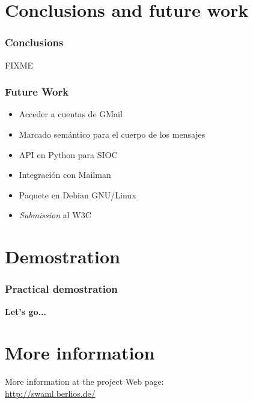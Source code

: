 \documentclass[spanish,notes=hide,16pt]{beamer}
\begin{document}
\section{Conclusions and future work}
\frame
{
  \frametitle{Conclusions}

  FIXME

}
\frame
{
  \frametitle{Future Work}

  \begin{itemize}
   \item \begin{Large}Acceder a cuentas de GMail\end{Large}
   \item \begin{Large}Marcado semántico para el cuerpo de los mensajes\end{Large}
   \item \begin{Large}API en Python para SIOC\end{Large}
   \item \begin{Large}Integración con Mailman\end{Large}
   \item \begin{Large}Paquete en Debian GNU/Linux\end{Large}
   \item \begin{Large}\textit{Submission} al W3C\end{Large}
  \end{itemize}
}

\section{Demostration}
\frame
{
  \frametitle{Practical demostration}

  \begin{center}
    \LARGE{\textbf{Let's go...}}
  \end{center}
}

\appendix

\section{More information}
\frame
{
  \begin{center}
    More information at the project Web page:\\
    \vspace{1cm}
    \LARGE{\href{http://swaml.berlios.de/}{http://swaml.berlios.de/}}\\
  \end{center}

}
\end{document}
